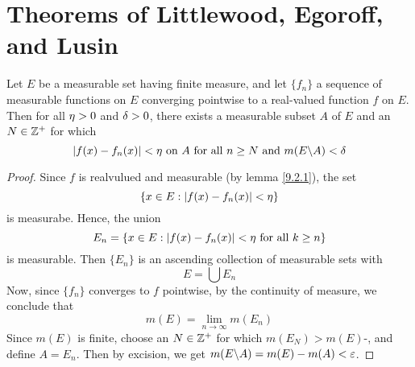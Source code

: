 \section{Theorems of Littlewood, Egoroff, and Lusin}

\begin{lemma}\label{9.3.1}
    Let $E$ be a measurable set having finite measure, and let  $\{f_n\}$ a
    sequence of measurable functions on $E$ converging pointwise to a real-valued
    function  $f$ on  $E$. Then for all  $\eta>0$ and  $\delta>0$, there exists a
    measurable subset  $A$ of $E$ and an  $N \in \mathbb{Z}^+$ for which
    \begin{equation*}
        |f(x)-f_n(x)|<\eta \text{ on } A \text{ for all } n \geq N \text{ and }
        m(E \backslash A)<\delta
    \end{equation*}
\end{lemma}
\begin{proof}
    Since $f$ is realvulued and measurable (by lemma \ref{9.2.1}), the set
    \begin{equation*}
        \{x \in E : |f(x)-f_n(x)|<\eta\}
    \end{equation*}
    is measurabe. Hence, the union
    \begin{equation*}
        E_n=\{x \in E : |f(x)-f_n(x)|<\eta \text{ for all } k \geq n\}
    \end{equation*}
    is measurable. Then $\{E_n\}$ is an ascending collection of measurable sets
    with
    \begin{equation*}
        E=\bigcup{E_n}
    \end{equation*}
    Now, since  $\{f_n\}$ converges to $f$ pointwise, by the continuity of
    measure, we conclude that
    \begin{equation*}
        m(E)=\lim_{n \xrightarrow{} \infty}{m(E_n)}
    \end{equation*}
    Since $m(E)$ is finite, choose an $N \in \mathbb{Z}^+$ for which  $m(E_N)>m(E)$-\e,
    and define $A=E_n$. Then by excision, we get  $m(E \backslash A)=m(E)-m(A)<\varepsilon$.
\end{proof}

